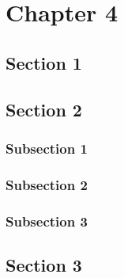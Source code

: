 \chapter{Chapter 4}%
\blindtext%
%
%
\section{Section 1}%
\blindtext%
%
%
\section{Section 2}%
\blindtext%
%
%
\subsection{Subsection 1}%
\blindtext%
%
%
\subsection{Subsection 2}%
\blindtext%
%
%
\subsection{Subsection 3}%
\blindtext%
%
%
\section{Section 3}%
\blindtext%
%
%
